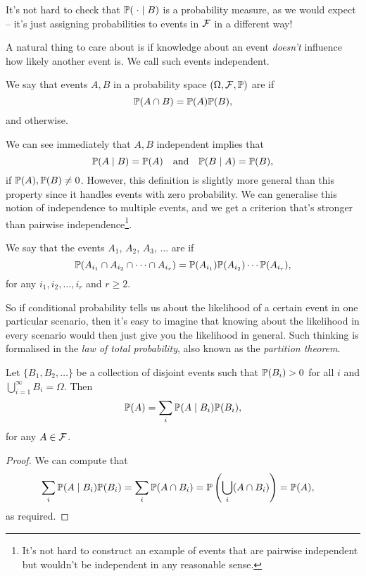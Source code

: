 \documentclass[10pt, a4paper]{article}
\begin{document}
It's not hard to check that $\mathbb{P}(\; \cdot \mid B)$ is a probability measure, as we would expect -- it's just assigning probabilities to events in $\mathcal{F}$ in a different way!

A natural thing to care about is if knowledge about an event \emph{doesn't} influence how likely another event is. We call such events independent.

\begin{definition}
We say that events $A, B$ in a probability space $(\Omega, \mathcal{F}, \mathbb{P})$ are  if
$$
\mathbb{P}(A \cap B) = \mathbb{P}(A) \mathbb{P}(B),
$$
and  otherwise.
\end{definition}

We can see immediately that $A, B$ independent implies that
$$
\mathbb{P}(A \mid B) = \mathbb{P}(A) \quad \text{and} \quad \mathbb{P}(B \mid A) = \mathbb{P}(B),
$$
if $\mathbb{P}(A), \mathbb{P}(B) \neq 0$. However, this definition is slightly more general than this property since it handles events with zero probability.
We can generalise this notion of independence to multiple events, and we get a criterion that's stronger than pairwise independence\footnote{It's not hard to construct an example of events that are pairwise independent but wouldn't be independent in any reasonable sense.}.

\begin{definition}
	We say that the events $A_1$, $A_2$, $A_3$, $\dots$ are  if
	$$
	\mathbb{P}(A_{i_1} \cap A_{i_2} \cap \cdots \cap A_{i_r}) = \mathbb{P}(A_{i_1}) \mathbb{P}(A_{i_2}) \cdots \mathbb{P}(A_{i_r}),
	$$
	for any $i_1, i_2, \dots, i_r$ and $r \geq 2$.
\end{definition}

So if conditional probability tells us about the likelihood of a certain event in one particular scenario, then it's easy to imagine that knowing about the likelihood in every scenario would then just give you the likelihood in general. Such thinking is formalised in the \emph{law of total probability}, also known as the \emph{partition theorem}.

\begin{theorem}
	Let $\{B_1, B_2, \dots\}$ be a collection of disjoint events such that $\mathbb{P}(B_i) > 0$ for all $i$ and $\bigcup_{i = 1}^{\infty} B_i = \Omega$. Then
	$$
	\mathbb{P}(A) = \sum_i \mathbb{P}(A \mid B_i) \mathbb{P}(B_i),
	$$
	for any $A \in \mathcal{F}$.
\end{theorem}
\begin{proof}
	We can compute that
	\begin{align*}
		\sum_{i} \mathbb{P}(A \mid B_i) \mathbb{P}(B_i) &= \sum_i \mathbb{P}(A \cap B_i) = \mathbb{P}\left(\bigcup_i (A \cap B_i)\right) = \mathbb{P}(A),
	\end{align*}
	as required.
\end{proof}
\end{document}

